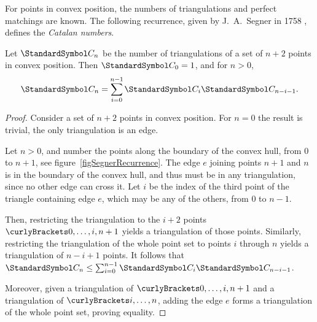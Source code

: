 \documentclass[10pt, a4paper, twoside]{basestyle}
\newcommand{\CatalanNumber}[1]{\StandardSymbol C_{#1}}
\begin{document}
For points in convex position, the numbers of triangulations and perfect matchings are known.
The following recurrence, given by J.~A.~Segner in 1758 \cite{Segner1758}, defines the \emph{Catalan numbers}.
\begin{theorem}[Segner]
Let $\CatalanNumber n$ be the number of triangulations of a set of $n+2$ points in convex position.
Then $\CatalanNumber 0 = 1$, and for $n>0$, \begin{equation}
\CatalanNumber n = \sum {i=0}[n-1] \CatalanNumber i \CatalanNumber {n-i-1}\text. \label{CatalanRecurrence}
\end{equation}
\begin{proof}
Consider a set of $n+2$ points in convex position.
For $n=0$ the result is trivial, the only triangulation is an edge.

Let $n > 0$, and number the points along the boundary of the convex hull, from $0$ to $n+1$,
see figure~\ref{figSegnerRecurrence}.
The edge $e$ joining points $n+1$ and $n$ is in the boundary of the convex hull, and thus must
be in any triangulation, since no other edge can cross it. Let $i$ be the index of the third point of the
triangle containing edge $e$, which may be any of the others, from $0$ to $n-1$.

Then, restricting the triangulation to the $i+2$ points $\set{0,\dotsc,i,n+1}$ yields a triangulation
of those points.
Similarly, restricting the triangulation of the whole point set to points $i$ through $n$ yields a triangulation of
$n-i+1$ points. It follows that $\CatalanNumber n \leq \sum {i=0}[n-1] \CatalanNumber i \CatalanNumber {n-i-1}$.

Moreover, given a triangulation of $\set{0,\dotsc,i,n+1}$ and a triangulation of $\set{i,\dotsc, n}$,
adding the edge $e$ forms a triangulation of the whole point set, proving equality.
\end{proof}
\end{theorem}
\end{document}
